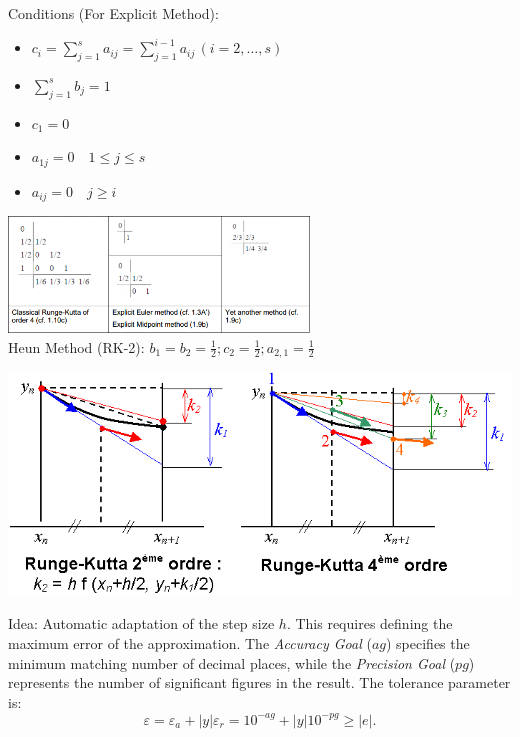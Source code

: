     \begin{minipage}{9cm}
        Conditions (For Explicit Method):
        \begin{itemize}
            \item $c_i = \sum\limits_{j=1}^s a_{ij} = \sum\limits_{j=1}^{i-1} a_{ij}\,(i=2,\ldots,s)$
            \item $\sum\limits_{j=1}^s b_j = 1$
            \item $c_1=0$
            \item $a_{1j} = 0 \quad 1\leq j\leq s $
            \item $a_{ij} = 0 \quad j\geq i$
        \end{itemize}
        \includegraphics[width=8cm]{./bilder/ode_rungekutta_butcher_examples.png}\\
        Heun Method (RK-2): $b_1 = b_2 = \frac{1}{2}; c_2=\frac{1}{2}; a_{2,1}=\frac{1}{2}$
    \end{minipage}

    \begin{center}
        \includegraphics[width=0.6\linewidth]{bilder/rungekutta.png}
    \end{center}

\newpage
{}
    Idea: Automatic adaptation of the step size $h$. This requires defining the maximum error of the approximation. The \emph{Accuracy Goal} ($ag$) specifies the minimum matching number of decimal places, while the \emph{Precision Goal} ($pg$) represents the number of significant figures in the result. The tolerance parameter is:
    $$\varepsilon = \varepsilon_a+ |y|\varepsilon_r=10^{-ag} + |y| 10^{-pg} \geq |e|.$$

